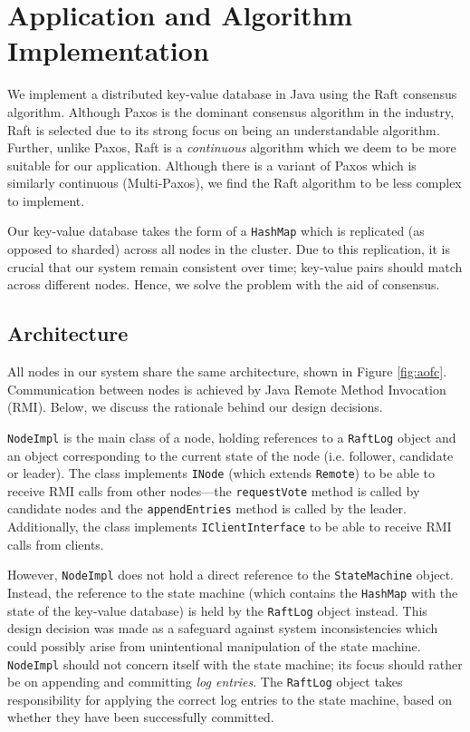\documentclass[12pt, a4paper]{article}
\begin{document}
\section{Application and Algorithm Implementation} \label{sec:application}
We implement a distributed key-value database in Java using the Raft consensus algorithm. Although Paxos is the dominant consensus algorithm in the industry, Raft is selected due to its strong focus on being an understandable algorithm. Further, unlike Paxos, Raft is a \textit{continuous} algorithm which we deem to be more suitable for our application. Although there is a variant of Paxos which is similarly continuous (Multi-Paxos), we find the Raft algorithm to be less complex to implement.

Our key-value database takes the form of a \texttt{HashMap} which is replicated (as opposed to sharded) across all nodes in the cluster. Due to this replication, it is crucial that our system remain consistent over time; key-value pairs should match across different nodes. Hence, we solve the problem with the aid of consensus.

\subsection{Architecture}
All nodes in our system share the same architecture, shown in Figure \ref{fig:aofc}. Communication between nodes is achieved by Java Remote Method Invocation (RMI). Below, we discuss the rationale behind our design decisions.

\texttt{NodeImpl} is the main class of a node, holding references to a \texttt{RaftLog} object and an object corresponding to the current state of the node (i.e. follower, candidate or leader). The class implements \texttt{INode} (which extends \texttt{Remote}) to be able to receive RMI calls from other nodes---the \texttt{requestVote} method is called by candidate nodes and the \texttt{appendEntries} method is called by the leader. Additionally, the class implements \texttt{IClientInterface} to be able to receive RMI calls from clients.

However, \texttt{NodeImpl} does not hold a direct reference to the \texttt{StateMachine} object. Instead, the reference to the state machine (which contains the \texttt{HashMap} with the state of the key-value database) is held by the \texttt{RaftLog} object instead. This design decision was made as a safeguard against system inconsistencies which could possibly arise from unintentional manipulation of the state machine. \texttt{NodeImpl} should not concern itself with the state machine; its focus should rather be on appending and committing \textit{log entries}. The \texttt{RaftLog} object takes responsibility for applying the correct log entries to the state machine, based on whether they have been successfully committed.
\end{document}
